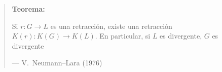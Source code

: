 \documentclass[beamer]{standalone}
\begin{document}
\begin{standaloneframe}
  \begin{quote}
    \textbf{Teorema:}

    Si $r\colon G\to L$ es una retracción, existe una retracción
    $K(r)\colon K(G)\to K(L)$. En particular, si $L$ es divergente,
    $G$ es divergente

    \hfill--- \color{purple} V.~Neumann--Lara (1976)
  \end{quote}
\end{standaloneframe}
\end{document}
